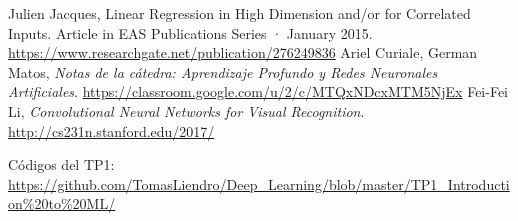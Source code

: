 
\begin{thebibliography}{9}
Julien Jacques, Linear Regression in High Dimension and/or for Correlated Inputs. Article in EAS Publications Series · January 2015. \url{https://www.researchgate.net/publication/276249836}
Ariel Curiale, German Matos, \textit{Notas de la cátedra: Aprendizaje Profundo y Redes Neuronales Artificiales}.
\url{https://classroom.google.com/u/2/c/MTQxNDcxMTM5NjEx}
Fei-Fei Li, \textit{Convolutional Neural Networks for Visual Recognition}.
\url{http://cs231n.stanford.edu/2017/}


Códigos del TP1: \url{https://github.com/TomasLiendro/Deep_Learning/blob/master/TP1_Introduction\%20to\%20ML/}
\end{thebibliography}
% 